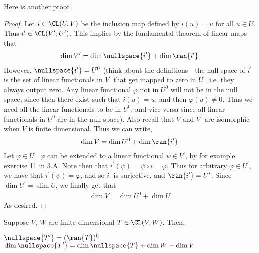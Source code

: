 \documentclass{article}
\begin{document}
  Here is another proof.
  \begin{proof}
    Let $i \in \CL(U, V)$ be the inclusion map defined by $i(u) = u$ for all $u \in U$. Thus $i^{\prime} \in \CL(V^{\prime}, U^{\prime})$. This implies by the fundamental theorem of linear
    maps that
    \begin{align*}
      \dim V^{\prime} = \dim\nullspace{i^{\prime}} + \dim\ran{i^{\prime}}
    \end{align*}
    However, $\nullspace{i^{\prime}} = U^0$ (think about the definitions - the null space of $i^{\prime}$ is the set of linear functionals in $V^{\prime}$ that get mapped to zero in
    $U^{\prime}$, i.e. they always output zero. Any linear functional $\varphi$ not in $U^0$ will not be in the null space, since then there exist such that $i(u) = u$, and then $\varphi(u)
    \neq 0$. Thus we need all the linear functionals to be in $U^0$, and vice versa since all linear functionals in $U^0$ are in the null space). Also recall that $V$ and $V^\prime$ are
    isomorphic when $V$ is finite dimensional. Thus we can write,
    \begin{align*}
      \dim V = \dim U^0 + \dim\ran{i^{\prime}}
    \end{align*}
    Let $\varphi \in U^{\prime}$. $\varphi$ can be extended to a linear functional $\psi \in V^{\prime}$, by for example exercise 11 in 3.A. Note then that $i^{\prime}(\psi) = \psi \circ i =
    \varphi$. Thus for arbitrary $\varphi \in U^{\prime}$, we have that $i^{\prime}(\psi) = \varphi$, and so $i^{\prime}$ is surjective, and $\ran{i^{\prime}} = U^{\prime}$. Since $\dim
    U^{\prime} = \dim U$, we finally get that
    \begin{align*}
      \dim V = \dim U^0 + \dim U
    \end{align*}
    As desired.
  \end{proof}
  \begin{prop}
    Suppose $V$, $W$ are finite dimensional $T \in \CL(V, W)$. Then,
    \begin{enumerate}[label=\alph*)]
        \ii 
          $\nullspace{T^{\prime}} = (\ran{T})^{0}$
        \ii 
          $\dim\nullspace{T^{\prime}} = \dim\nullspace{T} + \dim W - \dim V$
    \end{enumerate}
  \end{prop}
\end{document}
